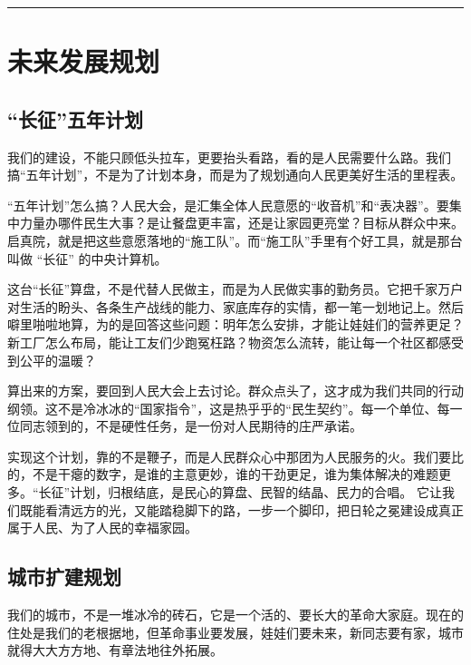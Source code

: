 \begin{center}\rule{0.5\linewidth}{0.5pt}\end{center}

\section{未来发展规划}\label{ux672aux6765ux53d1ux5c55ux89c4ux5212}

\subsection{``长征''五年计划}\label{ux957fux5f81ux4e94ux5e74ux8ba1ux5212}

我们的建设，不能只顾低头拉车，更要抬头看路，看的是人民需要什么路。我们搞``五年计划''，不是为了计划本身，而是为了规划通向人民更美好生活的里程表。

``五年计划''怎么搞？人民大会，是汇集全体人民意愿的``收音机''和``表决器''。要集中力量办哪件民生大事？是让餐盘更丰富，还是让家园更亮堂？目标从群众中来。启真院，就是把这些意愿落地的``施工队''。而``施工队''手里有个好工具，就是那台叫做 ``长征'' 的中央计算机。

这台``长征''算盘，不是代替人民做主，而是为人民做实事的勤务员。它把千家万户对生活的盼头、各条生产战线的能力、家底库存的实情，都一笔一划地记上。然后噼里啪啦地算，为的是回答这些问题：明年怎么安排，才能让娃娃们的营养更足？新工厂怎么布局，能让工友们少跑冤枉路？物资怎么流转，能让每一个社区都感受到公平的温暖？

算出来的方案，要回到人民大会上去讨论。群众点头了，这才成为我们共同的行动纲领。这不是冷冰冰的``国家指令''，这是热乎乎的``民生契约''。每一个单位、每一位同志领到的，不是硬性任务，是一份对人民期待的庄严承诺。

实现这个计划，靠的不是鞭子，而是人民群众心中那团为人民服务的火。我们要比的，不是干瘪的数字，是谁的主意更妙，谁的干劲更足，谁为集体解决的难题更多。``长征''计划，归根结底，是民心的算盘、民智的结晶、民力的合唱。 它让我们既能看清远方的光，又能踏稳脚下的路，一步一个脚印，把日轮之冕建设成真正属于人民、为了人民的幸福家园。

\subsection{城市扩建规划}\label{ux57ceux5e02ux6269ux5efaux89c4ux5212}

我们的城市，不是一堆冰冷的砖石，它是一个活的、要长大的革命大家庭。现在的住处是我们的老根据地，但革命事业要发展，娃娃们要未来，新同志要有家，城市就得大大方方地、有章法地往外拓展。

